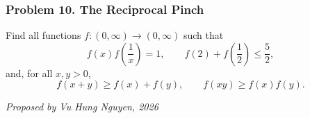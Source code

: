 \subsubsection*{Problem 10. The Reciprocal Pinch}

\begin{exercisebox}[medium]

Find all functions $f:(0,\infty)\to(0,\infty)$ such that
\[
f(x)f\left(\frac1x\right)=1,
\qquad
f(2)+f\left(\frac12\right)\le\frac52,
\]
and, for all $x,y>0$,
\[
f(x+y)\ge f(x)+f(y),
\qquad
f(xy)\ge f(x)f(y).
\]

\begin{flushright}
\textit{Proposed by Vu Hung Nguyen, 2026}
\end{flushright}


\end{exercisebox}